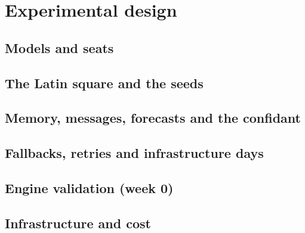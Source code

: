\section{Experimental design}
\label{sec:design}

\subsection{Models and seats}

\subsection{The Latin square and the seeds}

\subsection{Memory, messages, forecasts and the confidant}

\subsection{Fallbacks, retries and infrastructure days}

\subsection{Engine validation (week 0)}

\subsection{Infrastructure and cost}
